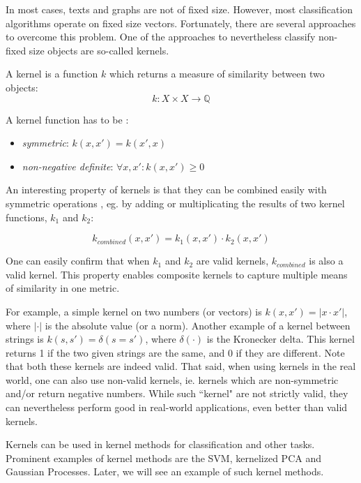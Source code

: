 In most cases, texts and graphs are not of fixed size.
However, most classification algorithms operate on fixed size vectors.
Fortunately, there are several approaches to overcome this problem.
One of the approaches to nevertheless classify non-fixed size objects are so-called kernels.

A kernel is a function $k$ which returns a measure of similarity between two objects:
\begin{equation*}
k: X \times X \rightarrow \mathbb{Q}
\end{equation*}

A kernel function has to be \cite{Kriege2012}:
\begin{itemize}
    \item{\textit{symmetric}: $k(x, x') = k(x', x)$}
    \item{\textit{non-negative definite}: $\forall x, x': k(x, x') \geq 0$}
\end{itemize}

An interesting property of kernels is that they can be combined easily with symmetric operations \cite[p.~296]{Bishop2006}, eg. by adding or multiplicating the results of two kernel functions, $k_1$ and $k_2$:

\begin{equation*}
k_{combined}(x, x') = k_1(x, x') \cdot k_2(x, x')
\end{equation*}

One can easily confirm that when $k_1$ and $k_2$ are valid kernels, $k_{combined}$ is also a valid kernel.
This property enables composite kernels to capture multiple means of similarity in one metric.

For example, a simple kernel on two numbers (or vectors) is $k(x, x') = | x \cdot x' |$, where $| \cdot |$ is the absolute value (or a norm).
Another example of a kernel between strings is $k(s, s') = \delta(s = s')$, where $\delta(\cdot)$ is the Kronecker delta. This kernel returns 1 if the two given strings are the same, and 0 if they are different.
Note that both these kernels are indeed valid.
That said, when using kernels in the real world, one can also use non-valid kernels, ie. kernels which are non-symmetric and/or return negative numbers. While such ``kernel" are not strictly valid, they can nevertheless perform good in real-world applications, even better than valid kernels.

Kernels can be used in kernel methods for classification and other tasks.
Prominent examples of kernel methods are the SVM, kernelized PCA and Gaussian Processes.
Later, we will see an example of such kernel methods.


